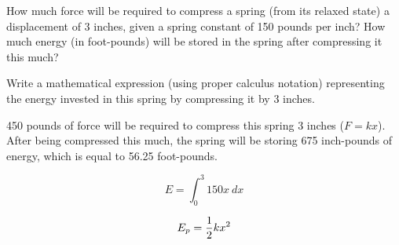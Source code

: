 

How much force will be required to compress a spring (from its relaxed state) a displacement of 3 inches, given a spring constant of 150 pounds per inch?  How much energy (in foot-pounds) will be stored in the spring after compressing it this much?

\vskip 10pt

Write a mathematical expression (using proper calculus notation) representing the energy invested in this spring by compressing it by 3 inches.







450 pounds of force will be required to compress this spring 3 inches ($F = kx$).  After being compressed this much, the spring will be storing 675 inch-pounds of energy, which is equal to 56.25 foot-pounds.

\vskip 10pt

$$E = \int_0^3 150x \> dx$$







$$E_p = {1 \over 2}kx^2$$





